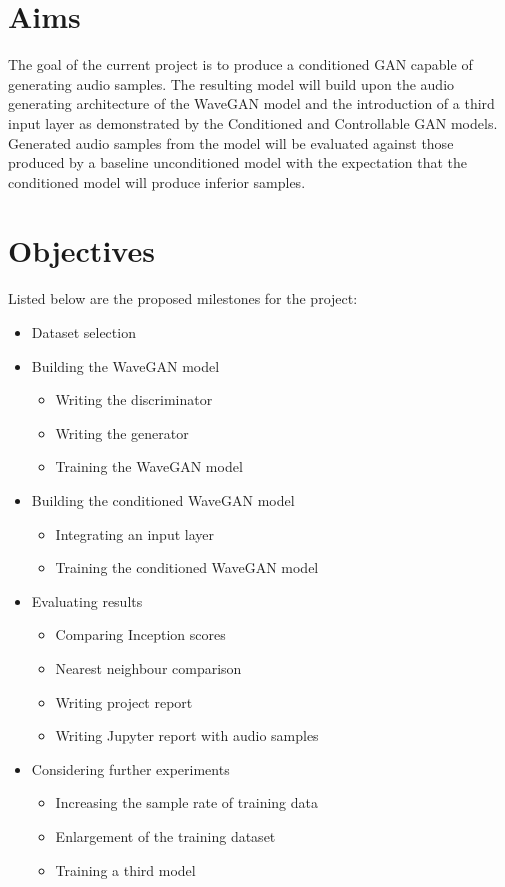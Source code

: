 \documentclass[a4paper, dvipsnames, titlepage]{article}
\begin{document}
\section{Aims}

The goal of the current project is to produce a conditioned GAN capable of generating audio samples.
The resulting model will build upon the audio generating architecture of the WaveGAN model and the introduction of a third input layer as demonstrated by the Conditioned and Controllable GAN models.
Generated audio samples from the model will be evaluated against those produced by a baseline unconditioned model with the expectation that the conditioned model will produce inferior samples.

\newpage

\section{Objectives}

Listed below are the proposed milestones for the project:

\begin{itemize}
\item Dataset selection
\item Building the WaveGAN model
  \begin{itemize}
  \item Writing the discriminator
  \item Writing the generator
  \item Training the WaveGAN model
  \end{itemize}
\item Building the conditioned WaveGAN model
  \begin{itemize}
  \item Integrating an input layer
  \item Training the conditioned WaveGAN model
  \end{itemize}
\item Evaluating results
  \begin{itemize}
  \item Comparing Inception scores
  \item Nearest neighbour comparison
  \item Writing project report
  \item Writing Jupyter report with audio samples
  \end{itemize}
\item Considering further experiments
  \begin{itemize}
  \item Increasing the sample rate of training data
  \item Enlargement of the training dataset
  \item Training a third model
  \end{itemize}
\end{itemize}
\end{document}
